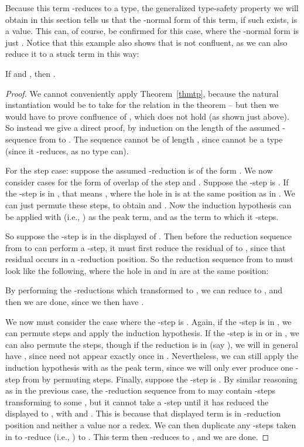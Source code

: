\documentclass{LMCS}
\begin{document}
\noindent Because this term -reduces to a type, the generalized
type-safety property we will obtain in this section tells us that the
-normal form of this term, if such exists, is a value.  This can,
of course, be confirmed for this case, where the -normal form is
just .  Notice that this example also shows that
 is not confluent, as we can also reduce it to a stuck term
in this way:


\begin{thm}
\label{thm:genpresstlc}
If  and , then .
\end{thm}

\begin{proof}
We cannot conveniently apply Theorem~\ref{thmtp}, because the natural
instantiation would be to take  for the relation  in
the theorem -- but then we would have to prove confluence of
, which does not hold (as shown just above).  So instead we
give a direct proof, by induction on the length of the assumed
-sequence from  to .  The sequence cannot be of length ,
since  cannot be a type (since it -reduces, as no type can).

For the step case: suppose the assumed -reduction is of the form
.  We now consider cases for the form of
overlap of the step  and .  Suppose the
-step is .  If the -step is in ,
that means , where the hole in  is at the same
position as in .  We can just permute these steps, to obtain
 and .  Now the
induction hypothesis can be applied with  (i.e., ) as
the peak term, and  as the term to which it -steps.  

So suppose the -step is in the displayed  of .
Then before the reduction sequence from  to  can perform a
-step, it must first reduce the residual of  to , since
that residual occurs in a -reduction position.  So the reduction
sequence from  to  must look like the following, where the
hole in  and in  are at the same position:

\noindent By performing the -reductions which transformed  to
, we can reduce  to , and then we are done,
since we then have .

We now must consider the case where the -step is .  Again, if the -step is in
, we can permute steps and apply the induction hypothesis.  If
the -step is in  or in , we can also permute the steps,
though if the reduction is in  (say ), we will in
general have , since  need not
appear exactly once in .  Nevertheless, we can still apply the
induction hypothesis with  as the peak term, since we will only
ever produce one -step from  by permuting steps.  Finally,
suppose the -step is .  By similar reasoning as in the previous case, the
-reduction sequence from  to  may
contain -steps transforming  to some , but it cannot
take a -step until it has reduced the displayed  to , with  and .  This is because that displayed term is in -reduction
position and neither a value nor a redex.  We can then duplicate any
-steps taken in  to -reduce  (i.e., ) to
.  This term then -reduces to , and we are
done.
\end{proof}
\end{document}
